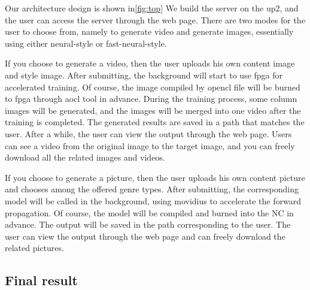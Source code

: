 Our architecture design is shown in\ref{fig:top} We build the server on the up2, and the user can access the server through the web page.
There are two modes for the user to choose from, namely to generate video and generate images, essentially using either neural-style or fast-neural-style.

If you choose to generate a video, then the user uploads his own content image and style image.
After submitting, the background will start to use fpga for accelerated training. Of course, the image compiled by opencl file will be burned to fpga through aocl tool in advance.
During the training process, some column images will be generated, and the images will be merged into one video after the training is completed.
The generated results are saved in a path that matches the user. After a while, the user can view the output through the web page.
Users can see a video from the original image to the target image, and you can freely download all the related images and videos.

If you choose to generate a picture, then the user uploads his own content picture and chooses among the offered genre types.
After submitting, the corresponding model will be called in the background, using movidius to accelerate the forward propagation. Of course, the model will be compiled and burned into the NC in advance.
The output will be saved in the path corresponding to the user. The user can view the output through the web page and can freely download the related pictures.
\subsection{Final result}